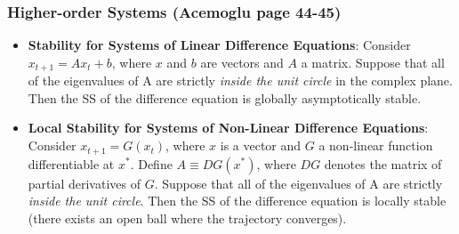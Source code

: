 \documentclass[11pt]{beamer}
\begin{document}

\begin{frame}
\frametitle{Higher-order Systems (Acemoglu page 44-45)}
\begin{itemize}\itemsep2ex
	\item \textbf{Stability for Systems of Linear Difference Equations}: Consider $x_{t+1} = A x_{t} + b$, where $x$ and $b$ are vectors and $A$ a matrix. Suppose that all of the eigenvalues of A are strictly \textit{inside the unit circle} in the complex plane. Then the SS of the difference equation is globally asymptotically stable.
	\item \textbf{Local Stability for Systems of Non-Linear Difference Equations}: Consider $x_{t+1} = G(x_t)$, where $x$ is a vector and $G$ a non-linear function differentiable at $x^*$. Define $A \equiv D G(x^*)$, where $D G$ denotes the matrix of partial derivatives of $G$. Suppose that all of the eigenvalues of A are strictly \textit{inside the unit circle}. Then the SS of the difference equation is locally stable (there exists an open ball where the trajectory converges).
\end{itemize}
\end{frame}























\end{document}
